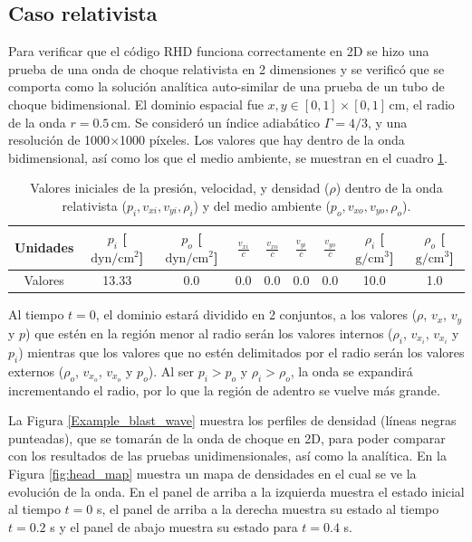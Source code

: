 \documentclass[12pt,a4paper]{book}
\begin{document}
\subsection{Caso relativista} \label{subsec:caso_relativista_2d}
Para verificar que el código RHD funciona correctamente en 2D se hizo una prueba de una onda de choque relativista en 2 dimensiones y se verificó que se comporta como la solución analítica auto-similar de 
una prueba de un tubo de choque bidimensional. El dominio espacial fue $x, y \in [0,1]\times[0,1] \, \text{cm}$, el radio de la 
onda $r = 0.5 \, \text{cm}$. Se consideró un índice adiabático $\Gamma = 4/3$, y una resolución de 1000$\times$1000 píxeles. Los valores que hay dentro de la onda bidimensional, así como 
los que el medio ambiente, se muestran en el cuadro \ref{Cuadro_parametros_choque_2D}. 
\begin{table}[htbp]
  \begin{center}
  \begin{tabular}{|c|c|c|c|c|c|c|c|c|}
  \hline 
  \textbf{Unidades} & \textbf{$p_i$} [$\text{dyn}/\text{cm}^2$] & 
  \textbf{$p_o$} [$\text{dyn}/\text{cm}^2$] & 
  $\frac{v_{xi}}{c}$ & $\frac{v_{xo}}{c}$  & $\frac{v_{yi}}{c}$ & $\frac{v_{yo}}{c}$   & 
  \textbf{$\rho_i$} [$\text{g}/\text{cm}^3$]& 
  \textbf{$\rho_o$} [$\text{g}/\text{cm}^3$]\\ 
  \hline 
  Valores & 13.33  & 0.0  & 0.0 & 0.0 & 0.0 & 0.0 & 10.0  & 1.0 \\ 
  \hline 
  \end{tabular}
  \caption{\label{Cuadro_parametros_choque_2D} Valores iniciales 
  de la presión, velocidad, y densidad ($\rho$) dentro de la onda relativista ($p_i, v_{xi}, v_{yi}, \rho_i$) y del medio ambiente ($p_o, v_{xo}, v_{yo}, \rho_o$).}
  \end{center}
\end{table}

Al tiempo $t = 0$, el dominio estará dividido en 2 conjuntos, a los valores ($\rho$, $v_x$, $v_y$ y $p$) que estén en la región menor al radio serán los valores internos ($\rho_i$, $v_{x_{i}}$, $v_{x_{i}}$ y $p_i$) mientras 
que los valores que no estén delimitados por el radio serán los valores externos ($\rho_o$, $v_{x_{o}}$, $v_{x_{o}}$ y $p_o$). Al ser $p_i > p_o$ y $\rho_i > \rho_o$, la onda se  expandirá incrementando el radio, por 
lo que la región de adentro se vuelve más grande.

La Figura \ref{Example_blast_wave} muestra los perfiles de densidad (líneas negras punteadas), que se tomarán de la onda de choque en 2D, para poder comparar con los resultados de las pruebas unidimensionales, 
así como la analítica. En la Figura \ref{fig:head_map} muestra un mapa de densidades en el cual se ve la evolución de la onda. En el panel de arriba a la izquierda muestra el estado inicial al tiempo $t = 0$ s, el panel 
de arriba a la derecha muestra su estado al tiempo $t = 0.2$ s y el panel de abajo muestra su estado para $t = 0.4$ s. 
\end{document}
